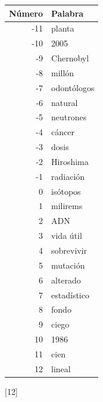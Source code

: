 \documentclass[a4paper]{article}
\newcounter{problema}
\begin{document}
\begin{problema}
\begin{table}[H]
\begin{tabular}{r l}
\textbf{Número} & \textbf{Palabra} \\
\hline
-11 & planta \\
-10 & 2005 \\
-9  & Chernobyl \\
-8  & millón \\
-7  & odontólogos \\
-6  & natural \\
-5  & neutrones \\
-4  & cáncer \\
-3  & dosis \\
-2  & Hiroshima \\
-1  & radiación \\
0   & isótopos \\
1   & milirems \\
2   & ADN \\
3   & vida útil \\
4   & sobrevivir \\
5   & mutación \\
6   & alterado \\
7   & estadístico \\
8   & fondo \\
9   & ciego \\
10  & 1986 \\
11  & cien \\
12  & lineal \\
\end{tabular}
\end{table}


\end{problema}
[12] \cite{NASA_SpaceMathIII}





\end{document}
